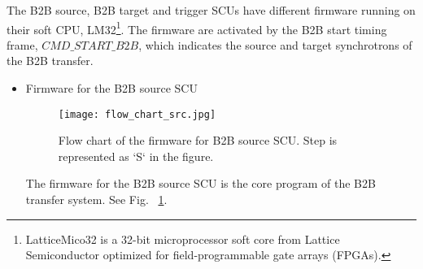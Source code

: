 The B2B source, B2B target and trigger SCUs have different firmware running on their soft \gls{CPU}, LM32\footnote{LatticeMico32 is a 32-bit microprocessor soft core from Lattice Semiconductor optimized for field-programmable gate arrays (\gls{FPGA}s).}. The firmware are activated by the  B2B start timing frame, $CMD\_START\_B2B$, which indicates the source and target synchrotrons of the B2B transfer. 
\begin{itemize}
\item Firmware for the B2B source SCU
\begin{figure}[!htb]
   \centering   
   \texttt{[image: flow\_chart\_src.jpg]}
   \caption{Flow chart of the firmware for B2B source SCU. Step is represented as `S` in the figure.}
   \label{flow_chart_src}
\end{figure}

The firmware for the B2B source SCU is the core program of the B2B transfer system. See Fig. ~\ref{flow_chart_src}. 


\end{itemize}
